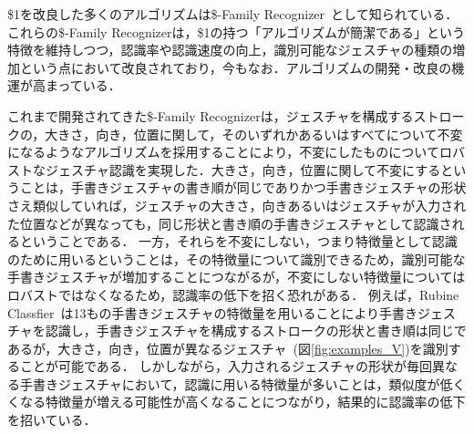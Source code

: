 \$1を改良した多くのアルゴリズムは\$-Family Recognizer~\cite{Anthony:2010:LMR:1839214.1839258,Reaver:2011:MQU:2021164.2021183,Li:2010:PFA:1753326.1753654,Anthony:2012:NFA:2305276.2305296,Herold:2012:CRF:2331067.2331074,Vatavu:2012:GPC:2388676.2388732,Taranta:2015:PPB:2788890.2788925,Pittman:2016:FFA:2856767.2856808,Vatavu:2012:OAF:2166966.2167022}として知られている．これらの\$-Family Recognizerは，\$1の持つ「アルゴリズムが簡潔である」という特徴を維持しつつ，認識率や認識速度の向上，識別可能なジェスチャの種類の増加という点において改良されており，今もなお．アルゴリズムの開発・改良の機運が高まっている．

これまで開発されてきた\$-Family Recognizerは，ジェスチャを構成するストロークの，大きさ，向き，位置に関して，そのいずれかあるいはすべてについて不変になるようなアルゴリズムを採用することにより，不変にしたものについてロバストなジェスチャ認識を実現した．大きさ，向き，位置に関して不変にするということは，手書きジェスチャの書き順が同じでありかつ手書きジェスチャの形状さえ類似していれば，ジェスチャの大きさ，向きあるいはジェスチャが入力された位置などが異なっても，同じ形状と書き順の手書きジェスチャとして認識されるということである．%
一方，それらを不変にしない，つまり特徴量として認識のために用いるということは，その特徴量について識別できるため，識別可能な手書きジェスチャが増加することにつながるが，不変にしない特徴量についてはロバストではなくなるため，認識率の低下を招く恐れがある．
例えば，Rubine Classfier~\cite{Rubine:1991:SGE:122718.122753}は13もの手書きジェスチャの特徴量を用いることにより手書きジェスチャを認識し，手書きジェスチャを構成するストロークの形状と書き順は同じであるが，大きさ，向き，位置が異なるジェスチャ~(図\ref{fig:examples_V})を識別することが可能である．
しかしながら，入力されるジェスチャの形状が毎回異なる手書きジェスチャにおいて，認識に用いる特徴量が多いことは，類似度が低くくなる特徴量が増える可能性が高くなることにつながり，結果的に認識率の低下を招いている．

